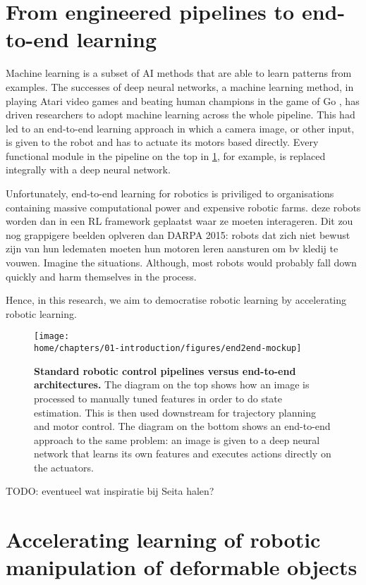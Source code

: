 \documentclass[\home/main.tex]{subfiles}
\begin{document}
\section{From engineered pipelines to end-to-end learning}
Machine learning is a subset of \gls{AI} methods that are able to learn patterns from examples. The successes of deep neural networks, a machine learning method, in playing Atari video games \autocite{Mnih2015} and beating human champions in the game of Go \autocite{gaemofGo2016}, has driven researchers to adopt machine learning across the whole pipeline. This had led to an end-to-end learning approach in which a camera image, or other input, is given to the robot and has to actuate its motors based directly. Every functional module in the pipeline on the top in \cref{fig:intro_end2end}, for example, is replaced integrally with a deep neural network.

Unfortunately, end-to-end learning for robotics is priviliged to organisations containing massive computational power and expensive robotic farms.
deze robots worden dan in een RL framework geplaatst waar ze moeten interageren. Dit zou nog grappigere beelden oplveren dan DARPA 2015: robots dat zich niet bewust zijn van hun ledematen moeten hun motoren leren aansturen om bv kledij te vouwen. Imagine the situations. Although, most robots would probably fall down quickly and harm themselves in the process. 

Hence, in this research, we aim to democratise robotic learning by accelerating robotic learning. 

\begin{figure}[htpb]
    \texttt{[image: \\home/chapters/01-introduction/figures/end2end-mockup]}
    \caption{\textbf{Standard robotic control pipelines versus end-to-end architectures.} The diagram on the top shows how an image is processed to manually tuned features in order to do state estimation. This is then used downstream for trajectory planning and motor control. The diagram on the bottom shows an end-to-end approach to the same problem: an image is given to a deep neural network that learns its own features and executes actions directly on the actuators.}
    \label{fig:intro_end2end}
\end{figure}

TODO: eventueel wat inspiratie bij Seita halen? 

\section{Accelerating learning of robotic manipulation of deformable objects}
\end{document}
